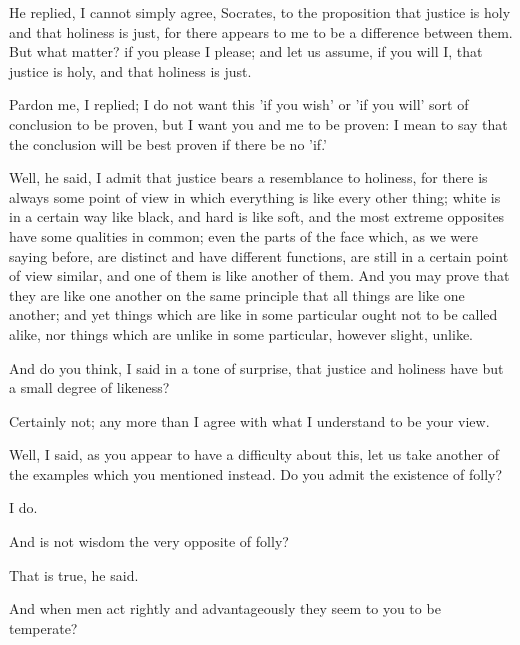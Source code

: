 \documentclass[11pt,letter]{article}
\begin{document}
\par  He replied, I cannot simply agree, Socrates, to the proposition that justice is holy and that holiness is just, for there appears to me to be a difference between them. But what matter? if you please I please; and let us assume, if you will I, that justice is holy, and that holiness is just.

\par  Pardon me, I replied; I do not want this 'if you wish' or 'if you will' sort of conclusion to be proven, but I want you and me to be proven: I mean to say that the conclusion will be best proven if there be no 'if.'

\par  Well, he said, I admit that justice bears a resemblance to holiness, for there is always some point of view in which everything is like every other thing; white is in a certain way like black, and hard is like soft, and the most extreme opposites have some qualities in common; even the parts of the face which, as we were saying before, are distinct and have different functions, are still in a certain point of view similar, and one of them is like another of them. And you may prove that they are like one another on the same principle that all things are like one another; and yet things which are like in some particular ought not to be called alike, nor things which are unlike in some particular, however slight, unlike.

\par  And do you think, I said in a tone of surprise, that justice and holiness have but a small degree of likeness?

\par  Certainly not; any more than I agree with what I understand to be your view.

\par  Well, I said, as you appear to have a difficulty about this, let us take another of the examples which you mentioned instead. Do you admit the existence of folly?

\par  I do.

\par  And is not wisdom the very opposite of folly?

\par  That is true, he said.

\par  And when men act rightly and advantageously they seem to you to be temperate?
\end{document}
